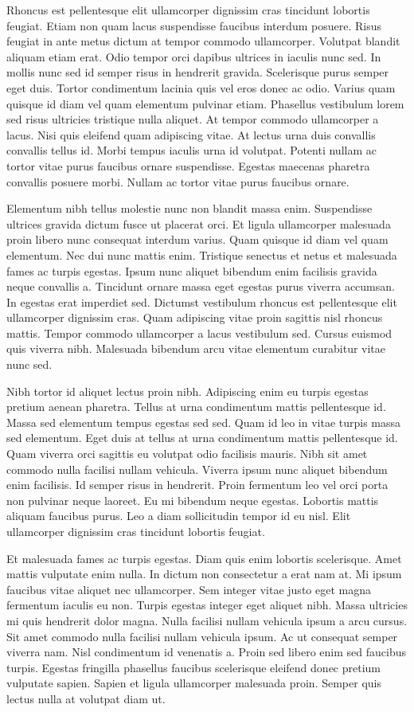 \documentclass[journal=jctc, manuscript=article]{achemso}
\begin{document}
Rhoncus est pellentesque elit ullamcorper dignissim cras tincidunt lobortis feugiat. Etiam non quam lacus suspendisse faucibus interdum posuere. Risus feugiat in ante metus dictum at tempor commodo ullamcorper. Volutpat blandit aliquam etiam erat. Odio tempor orci dapibus ultrices in iaculis nunc sed. In mollis nunc sed id semper risus in hendrerit gravida. Scelerisque purus semper eget duis. Tortor condimentum lacinia quis vel eros donec ac odio. Varius quam quisque id diam vel quam elementum pulvinar etiam. Phasellus vestibulum lorem sed risus ultricies tristique nulla aliquet. At tempor commodo ullamcorper a lacus. Nisi quis eleifend quam adipiscing vitae. At lectus urna duis convallis convallis tellus id. Morbi tempus iaculis urna id volutpat. Potenti nullam ac tortor vitae purus faucibus ornare suspendisse. Egestas maecenas pharetra convallis posuere morbi. Nullam ac tortor vitae purus faucibus ornare.

Elementum nibh tellus molestie nunc non blandit massa enim. Suspendisse ultrices gravida dictum fusce ut placerat orci. Et ligula ullamcorper malesuada proin libero nunc consequat interdum varius. Quam quisque id diam vel quam elementum. Nec dui nunc mattis enim. Tristique senectus et netus et malesuada fames ac turpis egestas. Ipsum nunc aliquet bibendum enim facilisis gravida neque convallis a. Tincidunt ornare massa eget egestas purus viverra accumsan. In egestas erat imperdiet sed. Dictumst vestibulum rhoncus est pellentesque elit ullamcorper dignissim cras. Quam adipiscing vitae proin sagittis nisl rhoncus mattis. Tempor commodo ullamcorper a lacus vestibulum sed. Cursus euismod quis viverra nibh. Malesuada bibendum arcu vitae elementum curabitur vitae nunc sed.

Nibh tortor id aliquet lectus proin nibh. Adipiscing enim eu turpis egestas pretium aenean pharetra. Tellus at urna condimentum mattis pellentesque id. Massa sed elementum tempus egestas sed sed. Quam id leo in vitae turpis massa sed elementum. Eget duis at tellus at urna condimentum mattis pellentesque id. Quam viverra orci sagittis eu volutpat odio facilisis mauris. Nibh sit amet commodo nulla facilisi nullam vehicula. Viverra ipsum nunc aliquet bibendum enim facilisis. Id semper risus in hendrerit. Proin fermentum leo vel orci porta non pulvinar neque laoreet. Eu mi bibendum neque egestas. Lobortis mattis aliquam faucibus purus. Leo a diam sollicitudin tempor id eu nisl. Elit ullamcorper dignissim cras tincidunt lobortis feugiat.

Et malesuada fames ac turpis egestas. Diam quis enim lobortis scelerisque. Amet mattis vulputate enim nulla. In dictum non consectetur a erat nam at. Mi ipsum faucibus vitae aliquet nec ullamcorper. Sem integer vitae justo eget magna fermentum iaculis eu non. Turpis egestas integer eget aliquet nibh. Massa ultricies mi quis hendrerit dolor magna. Nulla facilisi nullam vehicula ipsum a arcu cursus. Sit amet commodo nulla facilisi nullam vehicula ipsum. Ac ut consequat semper viverra nam. Nisl condimentum id venenatis a. Proin sed libero enim sed faucibus turpis. Egestas fringilla phasellus faucibus scelerisque eleifend donec pretium vulputate sapien. Sapien et ligula ullamcorper malesuada proin. Semper quis lectus nulla at volutpat diam ut.
\end{document}
